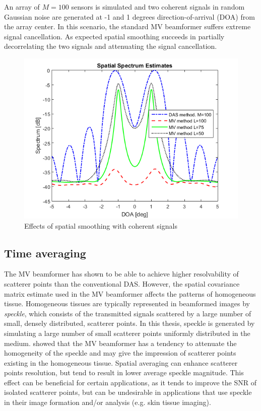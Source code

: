 \noindent
An array of $M=100$ sensors is simulated and two coherent signals in random Gaussian noise are generated at -1 and 1 degrees direction-of-arrival (DOA) from the array center. In this scenario, the standard MV beamformer suffers extreme signal cancellation. As expected spatial smoothing succeeds in partially decorrelating the two signals and attenuating the signal cancellation.

\begin{figure}[ht]
    \centering
    \includegraphics[width=\linewidth]{./images/background/spatial_averaging.png}
    \caption{Effects of spatial smoothing with coherent signals}
    \label{fig:spatial_smoothing}
\end{figure}


\subsection{Time averaging}
\label{sec:time_averaging}
The MV beamformer has shown to be able to achieve higher resolvability of scatterer points than the conventional DAS. However, the spatial covariance matrix estimate used in the MV beamformer affects the patterns of homogeneous tissue. Homogeneous tissues are typically represented in beamformed images by \textit{speckle}, which consists of the transmitted signals scattered by a large number of small, densely distributed, scatterer points. In this thesis, speckle is generated by simulating a large number of small scatterer points uniformly distributed in the medium.
\cite{speckle} showed that the MV beamformer has a tendency to attenuate the homogeneity of the speckle and may give the impression of scatterer points existing in the homogeneous tissue.
Spatial averaging can enhance scatterer points resolution, but tend to result in lower average speckle magnitude. This effect can be beneficial for certain applications, as it tends to improve the SNR of isolated scatterer points, but can be undesirable in applications that use speckle in their image formation and/or analysis (e.g. skin tissue imaging).

